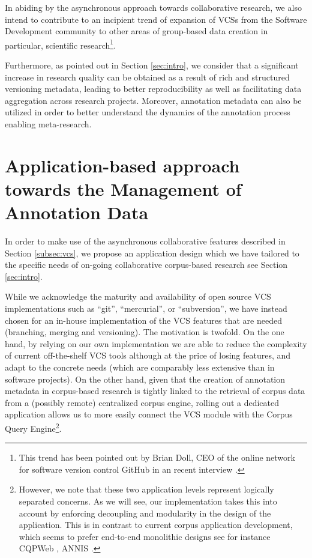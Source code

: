\documentclass{sig-alternate}
\begin{document}
In abiding by the asynchronous approach towards collaborative research, we also intend to
contribute to an incipient trend of expansion of VCSs from the Software Development community
to other areas of group-based data creation \textemdash in particular, scientific research\footnote{
  This trend has been pointed out by Brian Doll, CEO of the online network for software version
  control GitHub in an recent interview \cite{Begel2013}.
}.

Furthermore, as pointed out in Section \ref{sec:intro}, we consider that a significant increase in
research quality can be obtained as a result of rich and structured versioning metadata,
leading to better reproducibility as well as facilitating data aggregation across research
projects. Moreover, annotation metadata can also be utilized in order to better understand
the dynamics of the annotation process enabling meta-research.

\section{Application-based approach towards the Management of Annotation Data}\label{sec:case}

In order to make use of the asynchronous collaborative features described in Section
\ref{subsec:vcs}, we propose an application design which we have tailored to the specific needs
of on-going collaborative corpus-based research \textemdash see Section \ref{sec:intro}.

While we acknowledge the maturity and availability of open source VCS implementations such as
``git'', ``mercurial'', or ``subversion'', we have instead chosen for an in-house implementation
of the VCS features that are needed (branching, merging and versioning). The motivation is twofold.
On the one hand, by relying on our own implementation we are able to reduce the complexity of
current off-the-shelf VCS tools \textemdash although at the price of losing features,
and adapt to the concrete needs (which are comparably less extensive than in software projects).
On the other hand, given that the creation of annotation metadata in corpus-based research
is tightly linked to the retrieval of corpus data from a (possibly remote) centralized corpus engine,
rolling out a dedicated application allows us to more easily connect the VCS module with the Corpus
Query Engine\footnote{
  However, we note that these two application levels represent logically separated concerns.
  As we will see, our implementation takes this into account by enforcing decoupling and modularity
  in the design of the application. This is in contrast to current corpus application development,
  which seems to prefer end-to-end monolithic designs \textemdash see for instance
  CQPWeb \cite{Hardie2012}, ANNIS \cite{Zeldes2009}.
}.
\end{document}
